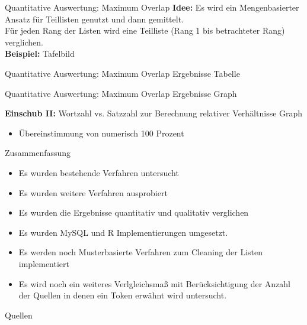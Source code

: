 \documentclass{beamer}
\begin{document}
\begin{frame}{Quantitative Auswertung: Maximum Overlap}
	\textbf{Idee: } Es wird ein Mengenbasierter Ansatz f\"ur Teillisten genutzt und dann gemittelt.\\
	F\"ur jeden Rang der Listen wird eine Teilliste (Rang 1 bis betrachteter Rang) verglichen.\\
	\vspace{1cm}
	\textbf{Beispiel:} Tafelbild
\end{frame}

\begin{frame}{Quantitative Auswertung: Maximum Overlap Ergebnisse}
	Tabelle
\end{frame}

\begin{frame}{Quantitative Auswertung: Maximum Overlap Ergebnisse}
	Graph
\end{frame}

\begin{frame}{\textbf{Einschub II: }Wortzahl vs. Satzzahl zur Berechnung relativer Verh\"altnisse}
	Graph
	\begin{itemize}
		\item{\"Ubereinstimmung von numerisch 100 Prozent}
	\end{itemize}
\end{frame}

\begin{frame}{Zusammenfassung}
	\begin{itemize}
		\item{Es wurden bestehende Verfahren untersucht}
		\item{Es wurden weitere Verfahren ausprobiert}
		\item{Es wurden die Ergebnisse quantitativ und qualitativ verglichen}
		\item{Es wurden MySQL und R Implementierungen umgesetzt.}
		\item{Es werden noch Musterbasierte Verfahren zum Cleaning der Listen implementiert}
		\item{Es wird noch ein weiteres Verlgleichsmaß mit Ber\"ucksichtigung der Anzahl der Quellen in denen ein Token erw\"ahnt wird untersucht.}
	\end{itemize}
\end{frame}


\begin{frame}[allowframebreaks]{Quellen}
	\nocite{*}
	
    
\end{frame}
\end{document}
